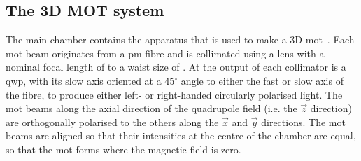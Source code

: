 \subsection{The 3D MOT system}\label{sec:3d_mot}
The main chamber contains the apparatus that is used to make a 3D
\ac{mot}~\cite{Raab1987}. Each \ac{mot} beam originates from a \ac{pm} fibre and is collimated using a
lens with a nominal focal length of  to a waist size of . At the output
of each collimator is a \ac{qwp}, with its slow axis oriented at a 45\(^\circ\)
angle to either the fast or slow axis of the fibre, to produce either left- or right-handed circularly polarised light. The \ac{mot} beams along the axial direction of the quadrupole field
(i.e. the \(\vec{z}\) direction) are orthogonally
polarised to the others along the \(\vec{x}\) and \(\vec{y}\) directions. The \ac{mot} beams are aligned so that their intensities at the centre of the chamber are equal, so that the \ac{mot} forms where the magnetic field is zero.
